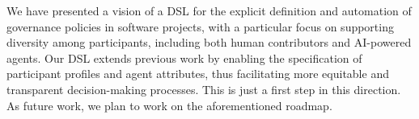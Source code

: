 We have presented a vision of a DSL for the explicit definition and automation of governance policies in software projects, with a particular focus on supporting diversity among participants, including both human contributors and AI-powered agents. 
Our DSL extends previous work by enabling the specification of participant profiles and agent attributes, thus facilitating more equitable and transparent decision-making processes. 
This is just a first step in this direction. As future work, we plan to work on the aforementioned roadmap.
